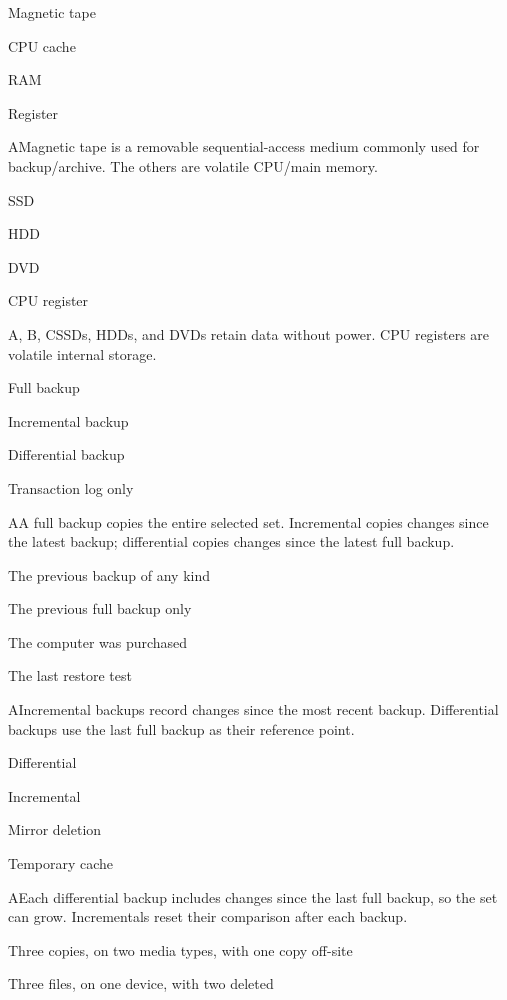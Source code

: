\begin{enumerate}[label=\textbf{Q\arabic*.}, leftmargin=*]
  {\item Magnetic tape
   \item CPU cache
   \item RAM
   \item Register}
  {A}{Magnetic tape is a removable sequential-access medium commonly used for backup/archive. The others are volatile CPU/main memory.}
  {\item SSD
   \item HDD
   \item DVD
   \item CPU register}
  {A, B, C}{SSDs, HDDs, and DVDs retain data without power. CPU registers are volatile internal storage.}
\fi
\ifnum{}
  {\item Full backup
   \item Incremental backup
   \item Differential backup
   \item Transaction log only}
  {A}{A full backup copies the entire selected set. Incremental copies changes since the latest backup; differential copies changes since the latest full backup.}
  {\item The previous backup of any kind
   \item The previous full backup only
   \item The computer was purchased
   \item The last restore test}
  {A}{Incremental backups record changes since the most recent backup. Differential backups use the last full backup as their reference point.}
  {\item Differential
   \item Incremental
   \item Mirror deletion
   \item Temporary cache}
  {A}{Each differential backup includes changes since the last full backup, so the set can grow. Incrementals reset their comparison after each backup.}
  {\item Three copies, on two media types, with one copy off-site
   \item Three files, on one device, with two deleted
}
\end{enumerate}
